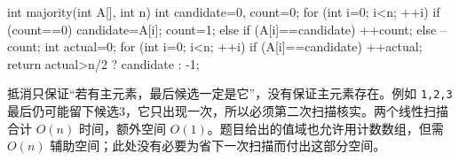 \documentclass{sidenotes-simplex}
\begin{document}
\begin{codeblock}[language={}]
int majority(int A[], int n) {
    int candidate=0, count=0;
    for (int i=0; i<n; ++i) {
        if (count==0) { candidate=A[i]; count=1; }
        else if (A[i]==candidate) ++count;
        else --count;
    }
    int actual=0;
    for (int i=0; i<n; ++i)
        if (A[i]==candidate) ++actual;
    return actual>n/2 ? candidate : -1;
}
\end{codeblock}

抵消只保证``若有主元素，最后候选一定是它''，没有保证主元素存在。例如 \texttt{1,2,3} 最后仍可能留下候选3，它只出现一次，所以必须第二次扫描核实。两个线性扫描合计 \(O(n)\) 时间，额外空间 \(O(1)\)。题目给出的值域也允许用计数数组，但需 \(O(n)\) 辅助空间；此处没有必要为省下一次扫描而付出这部分空间。
\end{document}
